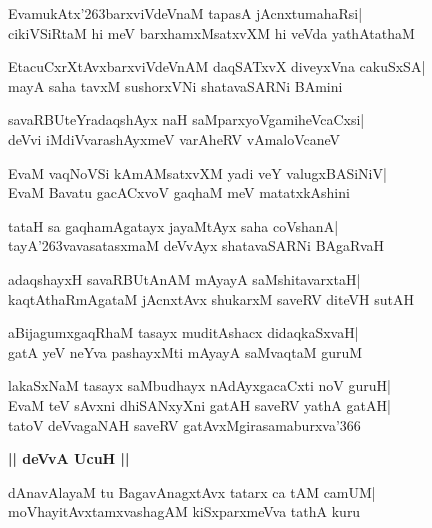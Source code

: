 \documentclass[twoside,12pt,openright]{book}
\def\S{\char'263}
\newcounter{shloka}[chapter]
\def\uvaca#1{\centerline{{\large\textbf{#1}}}}
\begin{document}
\begin{shloka}%
EvamukAtx\S barxviVdeVnaM tapasA jAcnxtumahaRsi|\\
cikiVSiRtaM hi meV barxhamxMsatxvXM hi veVda yathAtathaM
\end{shloka}

\begin{shloka}%
EtacuCxrXtAvxbarxviVdeVnAM daqSATxvX diveyxVna cakuSxSA|\\
mayA saha tavxM sushorxVNi shatavaSARNi BAmini
\end{shloka}

\begin{shloka}%
savaRBUteYradaqshAyx naH saMparxyoVgamiheVcaCxsi|\\
deVvi iMdiVvarashAyxmeV varAheRV vAmaloVcaneV
\end{shloka}

\begin{shloka}%
EvaM vaqNoVSi kAmAMsatxvXM yadi veY valugxBASiNiV|\\
EvaM Bavatu gacACxvoV gaqhaM meV matatxkAshini
\end{shloka}

\begin{shloka}%
tataH sa gaqhamAgatayx jayaMtAyx saha coVshanA|\\
tayA\S vavasatasxmaM deVvAyx shatavaSARNi BAgaRvaH
\end{shloka}

\begin{shloka}%
adaqshayxH savaRBUtAnAM mAyayA saMshitavarxtaH|\\
kaqtAthaRmAgataM jAcnxtAvx shukarxM saveRV diteVH sutAH
\end{shloka}

\begin{shloka}%
aBijagumxgaqRhaM tasayx muditAshacx didaqkaSxvaH|\\
gatA yeV neYva pashayxMti mAyayA saMvaqtaM guruM 
\end{shloka}

\begin{shloka}%
lakaSxNaM tasayx saMbudhayx nAdAyxgacaCxti noV guruH|\\
EvaM teV sAvxni dhiSANxyXni gatAH saveRV yathA gatAH|\\
tatoV deVvagaNAH saveRV gatAvxMgirasamaburxva\char'366
\end{shloka}

\uvaca{|| deVvA UcuH ||}
\begin{shloka}%
dAnavAlayaM tu BagavAnagxtAvx tatarx ca tAM camUM|\\
moVhayitAvxtamxvashagAM kiSxparxmeVva tathA kuru
\end{shloka}
\end{document}
